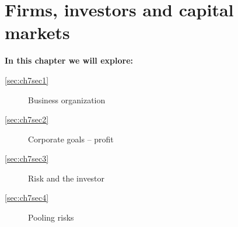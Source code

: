\chapter{Firms, investors and capital markets} \label{chap:firminvestorcapital}

\begin{topics}
\textbf{In this chapter we will explore:}
\begin{description}
\item[\ref{sec:ch7sec1}] Business organization
\item[\ref{sec:ch7sec2}] Corporate goals -- profit
\item[\ref{sec:ch7sec3}] Risk and the investor
\item[\ref{sec:ch7sec4}] Pooling risks
\end{description}
\end{topics}